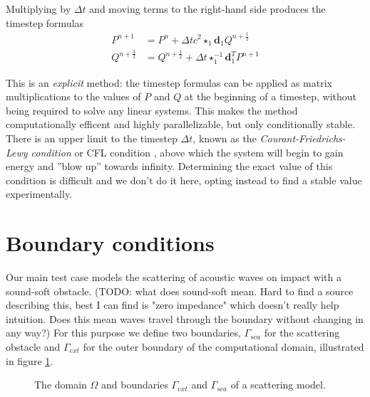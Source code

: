 \documentclass[utf8,english]{gradu3}
\begin{document}
Multiplying by $\Delta t$ and moving terms to the right-hand side
produces the timestep formulas
\begin{align}
  \label{eq:timestep_p}
  P^{n+1} &= P^n + \Delta t c^2 \star_1 \mathbf{d}_1 Q^{n+\frac{1}{2}} \\
  \label{eq:timestep_q}
  Q^{n+\frac{3}{2}} &= Q^{n+\frac{1}{2}} + \Delta t \star_1^{-1} \mathbf{d}_1^T P^{n+1}
\end{align}

This is an \textit{explicit} method:
the timestep formulas can be applied as matrix multiplications
to the values of $P$ and $Q$ at the beginning of a timestep,
without being required to solve any linear systems.
This makes the method computationally efficent and highly parallelizable,
but only conditionally stable.
There is an upper limit to the timestep $\Delta t$,
known as the \textit{Courant-Friedrichs-Lewy condition}
or CFL condition \parencite{courant_partial_1967},
above which the system will begin to gain energy and ''blow up'' towards infinity.
Determining the exact value of this condition is difficult
and we don't do it here, opting instead to find a stable value experimentally.


\section{Boundary conditions}\label{sec:boundary_conditions}

Our main test case models the scattering of acoustic waves
on impact with a sound-soft obstacle.
(TODO: what does sound-soft mean. Hard to find a source describing this,
best I can find is "zero impedance" which doesn't really help intuition.
Does this mean waves travel through the boundary without changing in any way?)
For this purpose we define two boundaries,
$\Gamma_{sca}$ for the scattering obstacle
and $\Gamma_{ext}$ for the outer boundary of the computational domain,
illustrated in figure \ref{fig:scatterer_domain}.

\begin{figure}[h]
  \centering
  \caption{The domain $\Omega$ and boundaries $\Gamma_{ext}$ and $\Gamma_{sca}$
    of a scattering model.}
  \label{fig:scatterer_domain}
\end{figure}
\end{document}
